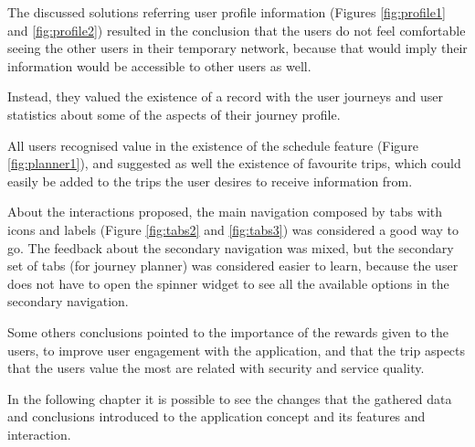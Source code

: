 The discussed solutions referring user profile information (Figures \ref{fig:profile1} and \ref{fig:profile2}) resulted in the conclusion that the users do not feel comfortable seeing the other users in their temporary network, because that would imply their information would be accessible to other users as well. 

Instead, they valued the existence of a record with the user journeys and user statistics about some of the aspects of their journey profile.

All users recognised value in the existence of the schedule feature (Figure \ref{fig:planner1}), and suggested as well the existence of favourite trips, which could easily be added to the trips the user desires to receive information from.

About the interactions proposed, the main navigation composed by tabs with icons and labels (Figure \ref{fig:tabs2} and \ref{fig:tabs3}) was considered a good way to go. The feedback about the secondary navigation was mixed, but the secondary set of tabs (for journey planner) was considered easier to learn, because the user does not have to open the spinner widget to see all the available options in the secondary navigation.

Some others conclusions pointed to the importance of the rewards given to the users, to improve user engagement with the application, and that the trip aspects that the users value the most are related with security and service quality.


In the following chapter it is possible to see the changes that the gathered data and conclusions introduced to the application concept and its features and interaction.
